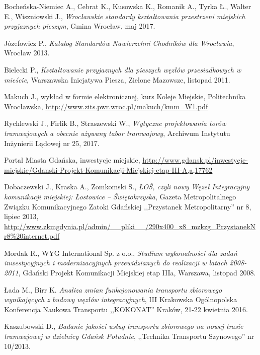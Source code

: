 \begin{thebibliography}{99}
	Bocheńska-Niemiec A., Cebrat K., Kusowska K., Romanik A., Tyrka Ł., Walter E., Wiszniowski J., \emph{Wrocławskie standardy kształtowania przestrzeni miejskich przyjaznych pieszym}, Gmina Wrocław, maj 2017.
	
	Józefowicz P., \emph{Katalog Standardów Nawierzchni Chodników dla Wrocławia}, Wrocław 2013.
	
	Bielecki P., \emph{Kształtowanie przyjaznych dla pieszych węzłów przesiadkowych w mieście}, Warszawska Inicjatywa Piesza, Zielone Mazowsze, listopad 2011.
	
	Makuch J., wykład w formie elektronicznej, kurs Koleje Miejskie, Politechnika Wrocławska, \url{http://www.zits.pwr.wroc.pl/makuch/kmm_W1.pdf}
	
	Rychlewski J., Firlik B., Straszewski W., \emph{Wytyczne projektowania torów tramwajowych a obecnie używany tabor tramwajowy}, Archiwum Instytutu Inżynierii Lądowej nr 25, 2017. 
	
	
	Portal Miasta Gdańska, inwestycje miejskie, \url{http://www.gdansk.pl/inwestycje-miejskie/Gdanski-Projekt-Komunikacji-Miejskiej-etap-III-A,a,17762}
	
	Dobaczewski J., Kraska A., Zomkomski S., \emph{ŁOŚ, czyli nowy Węzeł Integracyjny komunikacji miejskiej: Łostowice – Świętokrzyska}, Gazeta Metropolitalnego Związku Komunikacyjnego Zatoki Gdańskiej ,,Przystanek Metropolitarny'' nr 8, lipiec 2013, \url{http://www.zkmgdynia.pl/admin/__pliki__/290x400_x8_mzkzg_PrzystanekNr8%20internet.pdf}
	
	Mordak R., WYG International Sp. z o.o., \emph{Studium wykonalności dla zadań inwestycyjnych i modernizacyjnych przewidzianych do realizacji w latach 2008-2011}, Gdański Projekt Komunikacji Miejskiej etap IIIa, Warszawa, listopad 2008.
	
	Łada M., Birr K. \emph{Analiza zmian funkcjonowania transportu zbiorowego wynikających z budowy węzłów integracyjnych}, III Krakowska Ogólnopolska Konferencja Naukowa Transportu ,,KOKONAT'' Kraków, 21-22 kwietnia 2016.
	
	Kaszubowski D., \emph{Badanie jakości usług transportu zbiorowego na nowej trasie tramwajowej w dzielnicy Gdańsk Południe}, ,,Technika Transportu Szynowego'' nr 10/2013.
	

\end{thebibliography}
